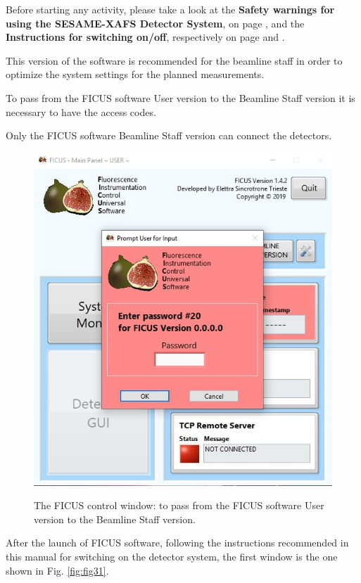 \documentclass[a4paper,12pt,oneside,pdflatex,italian,final,twocolumn]{article}
\begin{document}
Before starting any activity, please take a look at the \textbf{Safety warnings for using the SESAME-XAFS Detector System}, on page \pageref{accensione}, and the \textbf{Instructions for switching on/off}, respectively on page \pageref{accensione} and \pageref{spegnimento}.

This version of the software is recommended for the beamline staff in order to optimize the system settings for the planned measurements.

To pass from the FICUS software User version to the Beamline Staff version it is necessary to have the access codes.

Only the FICUS software Beamline Staff version can connect the detectors. 

\begin{figure}[h]
\centering
{\includegraphics[width=.5\textwidth]{Cattura74.jpg}} \quad
\caption{The FICUS control window: to pass from the FICUS software User version to the Beamline Staff version.}\label{fig:fig30}
\end{figure}

After the launch of FICUS software, following the instructions recommended in this manual for switching on the detector system, the first window is the one shown in Fig. \ref{fig:fig31}.
\end{document}
